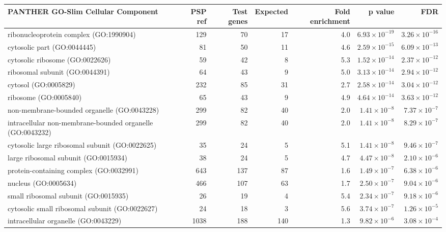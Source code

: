\begin{table}[ht]
\centering
\begin{adjustbox}{width=\textwidth}
\begin{tabular}{lrrrrrr}
  \hline
PANTHER GO-Slim Cellular Component & PSP ref & Test genes & Expected & Fold enrichment & p value & FDR \\ 
  \hline
ribonucleoprotein complex (GO:1990904) & 129 & 70 & 17 & 4.0 & $6.93 \times 10^{-19}$ & $3.26 \times 10^{-16}$ \\ 
  cytosolic part (GO:0044445) & 81 & 50 & 11 & 4.6 & $2.59 \times 10^{-15}$ & $6.09 \times 10^{-13}$ \\ 
  cytosolic ribosome (GO:0022626) & 59 & 42 & 8 & 5.3 & $1.52 \times 10^{-14}$ & $2.37 \times 10^{-12}$ \\ 
  ribosomal subunit (GO:0044391) & 64 & 43 & 9 & 5.0 & $3.13 \times 10^{-14}$ & $2.94 \times 10^{-12}$ \\ 
  cytosol (GO:0005829) & 232 & 85 & 31 & 2.7 & $2.58 \times 10^{-14}$ & $3.04 \times 10^{-12}$ \\ 
  ribosome (GO:0005840) & 65 & 43 & 9 & 4.9 & $4.64 \times 10^{-14}$ & $3.63 \times 10^{-12}$ \\ 
  non-membrane-bounded organelle (GO:0043228) & 299 & 82 & 40 & 2.0 & $1.41 \times 10^{-8}$ & $7.37 \times 10^{-7}$ \\ 
  intracellular non-membrane-bounded organelle (GO:0043232) & 299 & 82 & 40 & 2.0 & $1.41 \times 10^{-8}$ & $8.29 \times 10^{-7}$ \\ 
  cytosolic large ribosomal subunit (GO:0022625) & 35 & 24 & 5 & 5.1 & $1.41 \times 10^{-8}$ & $9.46 \times 10^{-7}$ \\ 
  large ribosomal subunit (GO:0015934) & 38 & 24 & 5 & 4.7 & $4.47 \times 10^{-8}$ & $2.10 \times 10^{-6}$ \\ 
  protein-containing complex (GO:0032991) & 643 & 137 & 87 & 1.6 & $1.49 \times 10^{-7}$ & $6.38 \times 10^{-6}$ \\ 
  nucleus (GO:0005634) & 466 & 107 & 63 & 1.7 & $2.50 \times 10^{-7}$ & $9.04 \times 10^{-6}$ \\ 
  small ribosomal subunit (GO:0015935) & 26 & 19 & 4 & 5.4 & $2.34 \times 10^{-7}$ & $9.18 \times 10^{-6}$ \\ 
  cytosolic small ribosomal subunit (GO:0022627) & 24 & 18 & 3 & 5.6 & $3.74 \times 10^{-7}$ & $1.26 \times 10^{-5}$ \\ 
  intracellular organelle (GO:0043229) & 1038 & 188 & 140 & 1.3 & $9.82 \times 10^{-6}$ & $3.08 \times 10^{-4}$ \\ 

\end{tabular}
\end{adjustbox}
\end{table}
